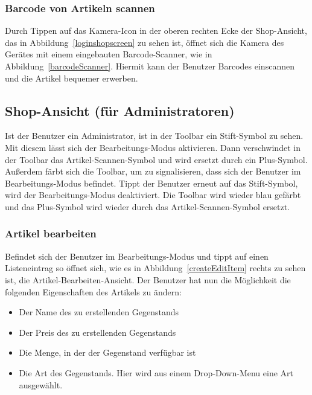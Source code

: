 
\subsubsection{Barcode von Artikeln scannen} \label{subsubsec:shop-scan-item}

Durch Tippen auf das Kamera-Icon in der oberen rechten Ecke der Shop-Ansicht, das in Abbildung~\ref{loginshopscreen} zu sehen ist, öffnet sich die Kamera des Gerätes mit einem eingebauten Barcode-Scanner, wie in Abbildung~\ref{barcodeScanner}.
Hiermit kann der Benutzer Barcodes einscannen und die Artikel bequemer erwerben.


\subsection{Shop-Ansicht (für Administratoren)} \label{subsec:shop-screen-admin}

Ist der Benutzer ein Administrator, ist in der Toolbar ein Stift-Symbol zu sehen.
Mit diesem lässt sich der Bearbeitungs-Modus aktivieren.
Dann verschwindet in der Toolbar das Artikel-Scannen-Symbol und wird ersetzt durch ein Plus-Symbol.
Außerdem färbt sich die Toolbar, um zu signalisieren, dass sich der Benutzer im Bearbeitungs-Modus befindet.
Tippt der Benutzer erneut auf das Stift-Symbol, wird der Bearbeitungs-Modus deaktiviert.
Die Toolbar wird wieder blau gefärbt und das Plus-Symbol wird wieder durch das Artikel-Scannen-Symbol ersetzt.

\subsubsection{Artikel bearbeiten} \label{subsubsec:shop-edit-items}

Befindet sich der Benutzer im Bearbeitungs-Modus und tippt auf einen Listeneintrag so öffnet sich, wie es in Abbildung~\ref{createEditItem} rechts zu sehen ist, die Artikel-Bearbeiten-Ansicht.
Der Benutzer hat nun die Möglichkeit die folgenden Eigenschaften des Artikels zu ändern:

\begin{itemize}
	\item Der Name des zu erstellenden Gegenstands

	\item Der Preis des zu erstellenden Gegenstands

	\item Die Menge, in der der Gegenstand verfügbar ist

	\item Die Art des Gegenstands.
	Hier wird aus einem Drop-Down-Menu eine Art ausgewählt.
\end{itemize}

